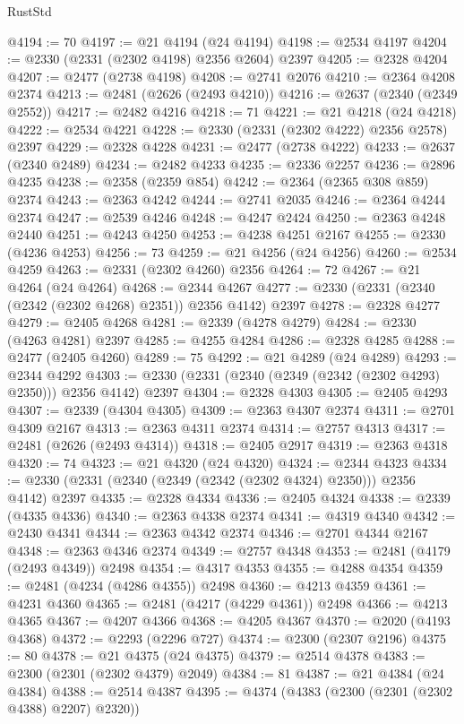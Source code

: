 \begin{lexlean}{RustStd}
\begin{coremodule}
@4194 := 70
@4197 := @21 @4194 (@24 @4194)
@4198 := @2534 @4197
@4204 := @2330 (@2331 (@2302 @4198) @2356 @2604) @2397
@4205 := @2328 @4204
@4207 := @2477 (@2738 @4198)
@4208 := @2741 @2076
@4210 := @2364 @4208 @2374
@4213 := @2481 (@2626 (@2493 @4210))
@4216 := @2637 (@2340 (@2349 @2552))
@4217 := @2482 @4216
@4218 := 71
@4221 := @21 @4218 (@24 @4218)
@4222 := @2534 @4221
@4228 := @2330 (@2331 (@2302 @4222) @2356 @2578) @2397
@4229 := @2328 @4228
@4231 := @2477 (@2738 @4222)
@4233 := @2637 (@2340 @2489)
@4234 := @2482 @4233
@4235 := @2336 @2257
@4236 := @2896 @4235
@4238 := @2358 (@2359 @854)
@4242 := @2364 (@2365 @308 @859) @2374
@4243 := @2363 @4242
@4244 := @2741 @2035
@4246 := @2364 @4244 @2374
@4247 := @2539 @4246
@4248 := @4247 @2424
@4250 := @2363 @4248 @2440
@4251 := @4243 @4250
@4253 := @4238 @4251 @2167
@4255 := @2330 (@4236 @4253)
@4256 := 73
@4259 := @21 @4256 (@24 @4256)
@4260 := @2534 @4259
@4263 := @2331 (@2302 @4260) @2356
@4264 := 72
@4267 := @21 @4264 (@24 @4264)
@4268 := @2344 @4267
@4277 := @2330 (@2331 (@2340 (@2342 (@2302 @4268) @2351)) @2356 @4142) @2397
@4278 := @2328 @4277
@4279 := @2405 @4268
@4281 := @2339 (@4278 @4279)
@4284 := @2330 (@4263 @4281) @2397
@4285 := @4255 @4284
@4286 := @2328 @4285
@4288 := @2477 (@2405 @4260)
@4289 := 75
@4292 := @21 @4289 (@24 @4289)
@4293 := @2344 @4292
@4303 := @2330 (@2331 (@2340 (@2349 (@2342 (@2302 @4293) @2350))) @2356 @4142) @2397
@4304 := @2328 @4303
@4305 := @2405 @4293
@4307 := @2339 (@4304 @4305)
@4309 := @2363 @4307 @2374
@4311 := @2701 @4309 @2167
@4313 := @2363 @4311 @2374
@4314 := @2757 @4313
@4317 := @2481 (@2626 (@2493 @4314))
@4318 := @2405 @2917
@4319 := @2363 @4318
@4320 := 74
@4323 := @21 @4320 (@24 @4320)
@4324 := @2344 @4323
@4334 := @2330 (@2331 (@2340 (@2349 (@2342 (@2302 @4324) @2350))) @2356 @4142) @2397
@4335 := @2328 @4334
@4336 := @2405 @4324
@4338 := @2339 (@4335 @4336)
@4340 := @2363 @4338 @2374
@4341 := @4319 @4340
@4342 := @2430 @4341
@4344 := @2363 @4342 @2374
@4346 := @2701 @4344 @2167
@4348 := @2363 @4346 @2374
@4349 := @2757 @4348
@4353 := @2481 (@4179 (@2493 @4349)) @2498
@4354 := @4317 @4353
@4355 := @4288 @4354
@4359 := @2481 (@4234 (@4286 @4355)) @2498
@4360 := @4213 @4359
@4361 := @4231 @4360
@4365 := @2481 (@4217 (@4229 @4361)) @2498
@4366 := @4213 @4365
@4367 := @4207 @4366
@4368 := @4205 @4367
@4370 := @2020 (@4193 @4368)
@4372 := @2293 (@2296 @727)
@4374 := @2300 (@2307 @2196)
@4375 := 80
@4378 := @21 @4375 (@24 @4375)
@4379 := @2514 @4378
@4383 := @2300 (@2301 (@2302 @4379) @2049)
@4384 := 81
@4387 := @21 @4384 (@24 @4384)
@4388 := @2514 @4387
@4395 := @4374 (@4383 (@2300 (@2301 (@2302 @4388) @2207) @2320))

\end{coremodule}
\end{lexlean}

